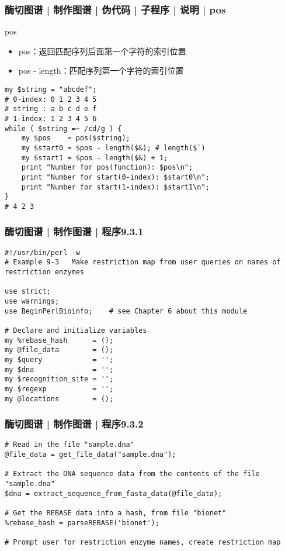 \begin{frame}[fragile]
  \frametitle{酶切图谱 | 制作图谱 | 伪代码 | 子程序 | 说明 | \alert{pos}}
  \begin{block}{pos}
    \begin{itemize}
      \item pos：返回匹配序列后面第一个字符的索引位置
      \item pos - length：匹配序列第一个字符的索引位置
    \end{itemize}
  \end{block}
  \pause
  \vspace{-0.5em}
\begin{lstlisting}[basicstyle=\small\tt,numberstyle=\footnotesize]
my $string = "abcdef";
# 0-index: 0 1 2 3 4 5
# string : a b c d e f
# 1-index: 1 2 3 4 5 6
while ( $string =~ /cd/g ) {
    my $pos    = pos($string);
    my $start0 = $pos - length($&); # length($`)
    my $start1 = $pos - length($&) + 1;
    print "Number for pos(function): $pos\n";
    print "Number for start(0-index): $start0\n";
    print "Number for start(1-index): $start1\n";
}
# 4 2 3
\end{lstlisting}
\end{frame}

\begin{frame}[fragile]
  \frametitle{酶切图谱 | 制作图谱 | 程序9.3.1}
\begin{lstlisting}[firstnumber=1,basicstyle=\small\tt,numberstyle=\footnotesize]
#!/usr/bin/perl -w
# Example 9-3   Make restriction map from user queries on names of restriction enzymes

use strict;
use warnings;
use BeginPerlBioinfo;    # see Chapter 6 about this module

# Declare and initialize variables
my %rebase_hash      = ();
my @file_data        = ();
my $query            = '';
my $dna              = '';
my $recognition_site = '';
my $regexp           = '';
my @locations        = ();
\end{lstlisting}
\end{frame}

\begin{frame}[fragile]
  \frametitle{酶切图谱 | 制作图谱 | 程序9.3.2}
\begin{lstlisting}[firstnumber=17]
# Read in the file "sample.dna"
@file_data = get_file_data("sample.dna");

# Extract the DNA sequence data from the contents of the file "sample.dna"
$dna = extract_sequence_from_fasta_data(@file_data);

# Get the REBASE data into a hash, from file "bionet"
%rebase_hash = parseREBASE('bionet');

# Prompt user for restriction enzyme names, create restriction map
\end{lstlisting}
\end{frame}

